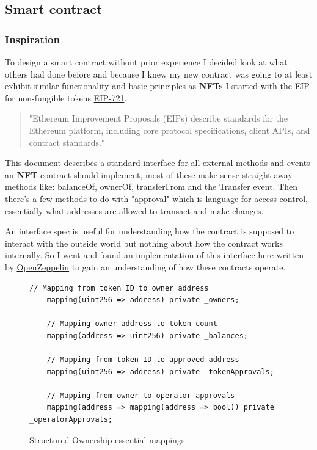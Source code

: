 \subsection{Smart contract}

\subsubsection{Inspiration}

To design a smart contract without prior experience I decided look at what others had done before and because I knew my new contract was going to at least exhibit similar functionality and basic principles as \textbf{NFTs} I started with the EIP for non-fungible tokens \href{https://eips.ethereum.org/EIPS/eip-721}{EIP-721}. 

\begin{quote}
"Ethereum Improvement Proposals (EIPs) describe standards for the Ethereum platform, including core protocol specifications, client APIs, and contract standards."\cite{eip}
\end{quote}

This document describes a standard interface for all external methods and events an \textbf{NFT} contract should implement, most of these make sense straight away methods like: balanceOf, ownerOf, transferFrom and the Transfer event. Then there's a few methods to do with "approval" which is  language for access control, essentially what addresses are allowed to transact and make changes.

An interface spec is useful for understanding how the contract is supposed to interact with the outside world but nothing about how the contract works internally. So I went and found an implementation of this interface \href{https://github.com/OpenZeppelin/openzeppelin-contracts/blob/master/contracts/token/ERC721/ERC721.sol}{here} written by \href{https://github.com/OpenZeppelin}{OpenZeppelin} to gain an understanding of how these contracts operate.

\begin{figure}[H]
\caption{Structured Ownership essential mappings}
\centering
\begin{lstlisting}[language=Solidity]
	// Mapping from token ID to owner address
	mapping(uint256 => address) private _owners;

	// Mapping owner address to token count
	mapping(address => uint256) private _balances;

	// Mapping from token ID to approved address
	mapping(uint256 => address) private _tokenApprovals;

	// Mapping from owner to operator approvals
	mapping(address => mapping(address => bool)) private _operatorApprovals;
\end{lstlisting}
\end{figure}

